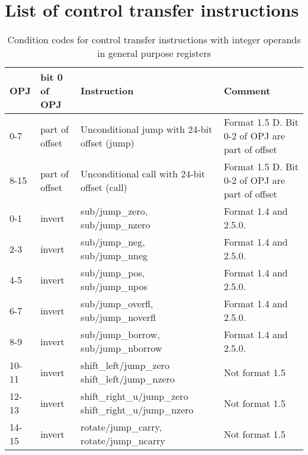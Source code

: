 \documentclass[forwardcom.tex]{subfiles}
\begin{document}
\section{List of control transfer instructions}

\begin{longtable}
{|p{10mm}|p{14mm}|p{55mm}|p{50mm}|}
\caption{Condition codes for control transfer instructions with integer operands in general purpose registers }
\label{table:controlTransferInstructions}
\endfirsthead
\endhead
\hline
OPJ & bit 0 \newline of OPJ & Instruction & Comment \\
\hline
0-7 & part of offset & Unconditional jump with 24-bit offset (jump) & Format 1.5 D. Bit 0-2 of OPJ are part of offset \\
\hline
8-15 & part of offset & Unconditional call with 24-bit offset (call) & Format 1.5 D.  Bit 0-2 of OPJ are part of offset \\
\hline
0-1 & invert & sub/jump\_zero, \newline sub/jump\_nzero & Format 1.4 and 2.5.0. \\
\hline
2-3 & invert & sub/jump\_neg, \newline sub/jump\_nneg & Format 1.4 and 2.5.0.  \\
\hline
4-5 & invert & sub/jump\_pos, \newline sub/jump\_npos & Format 1.4 and 2.5.0.  \\
\hline
6-7 & invert & sub/jump\_overfl, \newline sub/jump\_noverfl & Format 1.4 and 2.5.0.  \\
\hline
8-9 & invert & sub/jump\_borrow, \newline sub/jump\_nborrow & Format 1.4 and 2.5.0. \\
\hline
10-11 & invert & shift\_left/jump\_zero \newline shift\_left/jump\_nzero & Not format 1.5 \\
\hline
12-13 & invert & shift\_right\_u/jump\_zero \newline shift\_right\_u/jump\_nzero & Not format 1.5 \\
\hline
14-15 & invert & rotate/jump\_carry, \newline rotate/jump\_ncarry & Not format 1.5 \\
\hline


\end{longtable}
\end{document}
